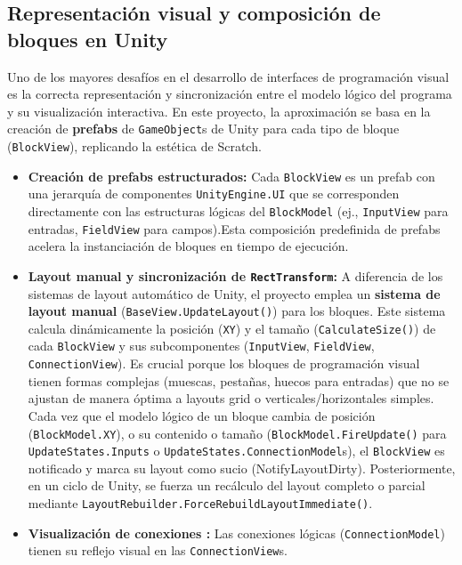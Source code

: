 \subsection{Representación visual y composición de bloques en Unity}
Uno de los mayores desafíos en el desarrollo de interfaces de programación visual es la correcta representación y sincronización entre el modelo lógico del programa y su visualización interactiva. En este proyecto, la aproximación se basa en la creación de \textbf{prefabs} de \texttt{GameObject}s de Unity para cada tipo de bloque (\texttt{BlockView}), replicando la estética de Scratch.
\begin{itemize}
	\item \textbf{Creación de prefabs estructurados:} Cada \texttt{BlockView} es un prefab con una jerarquía de componentes \texttt{UnityEngine.UI} que se corresponden directamente con las estructuras lógicas del \texttt{BlockModel} (ej., \texttt{InputView} para entradas, \texttt{FieldView} para campos).Esta composición predefinida de prefabs acelera la instanciación de bloques en tiempo de ejecución.
	
	\item \textbf{Layout manual y sincronización de \texttt{RectTransform}:} A diferencia de los sistemas de layout automático de Unity, el proyecto emplea un \textbf{sistema de layout manual} (\texttt{BaseView.UpdateLayout()}) para los bloques. Este sistema calcula dinámicamente la posición (\texttt{XY}) y el tamaño (\texttt{CalculateSize()}) de cada \texttt{BlockView} y sus subcomponentes (\texttt{InputView},
	 \texttt{FieldView}, \texttt{ConnectionView}). Es crucial porque los bloques de programación visual tienen formas complejas (muescas, pestañas, huecos para entradas) que no se ajustan de manera óptima a layouts grid o verticales/horizontales simples. Cada vez que el modelo lógico de un bloque cambia de posición (\texttt{BlockModel.XY}), o su contenido o tamaño (\texttt{BlockModel.FireUpdate()} para \texttt{UpdateStates.Inputs} o \texttt{UpdateStates.ConnectionModel}s), el \texttt{BlockView} es notificado y marca su layout como sucio (NotifyLayoutDirty). Posteriormente, en un ciclo de Unity, se fuerza un recálculo del layout completo o parcial mediante \texttt{LayoutRebuilder.ForceRebuildLayoutImmediate()}.
	\item \textbf{Visualización de conexiones :} Las conexiones lógicas (\texttt{ConnectionModel}) tienen su reflejo visual en las \texttt{ConnectionView}s. 
\end{itemize}


